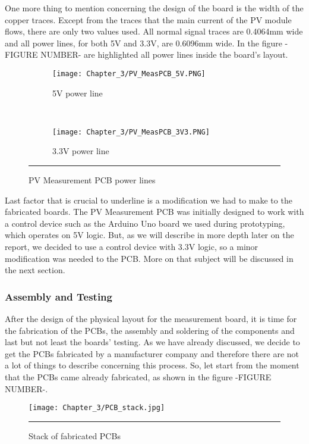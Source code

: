 One more thing to mention concerning the design of the board is the width of the copper traces. Except from the traces that the main current of the PV module flows, there are only two values used. All normal signal traces are 0.4064mm wide and all power lines, for both 5V and 3.3V, are 0.6096mm wide. In the figure -FIGURE NUMBER- are highlighted all power lines inside the board's layout.\\


\begin{figure}[htbp]
	\centering
	\begin{subfigure}[b]{.45\textwidth}
		\texttt{[image: Chapter\_3/PV\_MeasPCB\_5V.PNG]}
	    \caption[]{5V power line}
	    \label{fig:PV_MeasPCB_5V}
	\end{subfigure}
    ~
	\begin{subfigure}[b]{.45\textwidth}
		\texttt{[image: Chapter\_3/PV\_MeasPCB\_3V3.PNG]}
	    \caption[]{3.3V power line}
	    \label{fig:PV_MeasPCB_3V3}
	\end{subfigure}
	\rule{35em}{0.5pt}
	\caption{PV Measurement PCB power lines}
	\label{fig:PV_MeasPCB_powerLines}
\end{figure}

Last factor that is crucial to underline is a modification we had to make to the fabricated boards. The PV Measurement PCB was initially designed to work with a control device such as the Arduino Uno board we used during prototyping, which operates on 5V logic. But, as we will describe in more depth later on the report, we decided to use a control device with 3.3V logic, so a minor modification was needed to the PCB. More on that subject will be discussed in the next section.

\subsubsection{Assembly and Testing}
After the design of the physical layout for the measurement board, it is time for the fabrication of the PCBs, the assembly and soldering of the components and last but not least the boards' testing. As we have already discussed, we decide to get the PCBs fabricated by a manufacturer company and therefore there are not a lot of things to describe concerning this process. So, let start from the moment that the PCBs came already fabricated, as shown in the figure -FIGURE NUMBER-.\\


\begin{figure}[htbp]
	\centering
		\texttt{[image: Chapter\_3/PCB\_stack.jpg]}
		\rule{35em}{0.5pt}
	\caption{Stack of fabricated PCBs}
	\label{fig:PCB_stack}
\end{figure}

